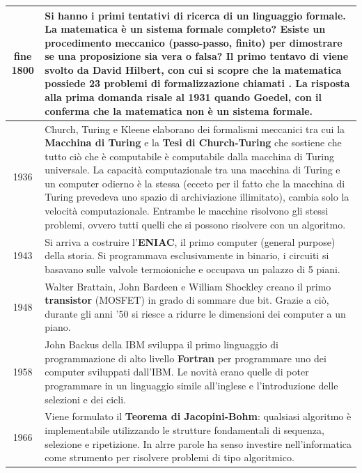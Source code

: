 \documentclass[a4paper]{article}
\begin{document}
\begin{center}
	\begin{tabularx}{\textwidth}{c X}
		fine 1800
		& Si hanno i primi tentativi di \textbf{ricerca di un linguaggio formale}. La matematica è un sistema formale
		completo? Esiste un procedimento meccanico (passo-passo, finito) per dimostrare se una proposizione sia vera
		o falsa? Il primo tentavo di \textit{\say{formalizzazione della matematica}} viene svolto da David Hilbert, con
		cui si scopre che la matematica possiede 23 problemi di formalizzazione chiamati \textit{\say{23 problemi di Hilbert}}.
		La risposta alla prima domanda risale al 1931 quando Goedel, con il \textit{\say{teorema di incompletezza}}
		conferma che la matematica non è un sistema formale. \\
		\midrule
		
		1936
		& Church, Turing e Kleene elaborano dei formalismi meccanici tra cui la \textbf{Macchina di Turing} e la
		\textbf{Tesi di Church-Turing} che sostiene che tutto ciò che è computabile è computabile dalla macchina di
		Turing universale. La capacità computazionale tra una macchina di Turing e un computer odierno è la stessa
		(ecceto per il fatto che la macchina di Turing prevedeva uno spazio di archiviazione illimitato), cambia
		solo la velocità computazionale. Entrambe le macchine risolvono gli stessi problemi, ovvero tutti quelli
		che si possono risolvere con un algoritmo. \\
		\midrule
		
		1943
		& Si arriva a costruire l'\textbf{ENIAC}, il primo computer (general purpose) della storia. Si programmava
		esclusivamente in binario, i circuiti si basavano sulle valvole termoioniche e occupava un palazzo di 5 piani. \\
		\midrule
		
		1948
		& Walter Brattain, John Bardeen e William Shockley creano il primo \textbf{transistor} (MOSFET) in grado di
		sommare due bit. Grazie a ciò, durante gli anni '50 si riesce a ridurre le dimensioni dei computer a un piano. \\
		\midrule
		
		1958
		& John Backus della IBM sviluppa il primo linguaggio di programmazione di alto livello \textbf{Fortran} per
		programmare uno dei computer sviluppati dall'IBM. Le novità erano quelle di poter programmare in un linguaggio
		simile all'inglese e l'introduzione delle selezioni e dei cicli. \\
		\midrule

		1966
		& Viene formulato il \textbf{Teorema di Jacopini-Bohm}: qualsiasi algoritmo è implementabile utilizzando le
		strutture fondamentali di sequenza, selezione e ripetizione. In alrre parole ha senso investire nell'informatica 
		come strumento per risolvere problemi di tipo algoritmico. \\
		\midrule
		

\end{tabularx}
\end{center}
\end{document}
